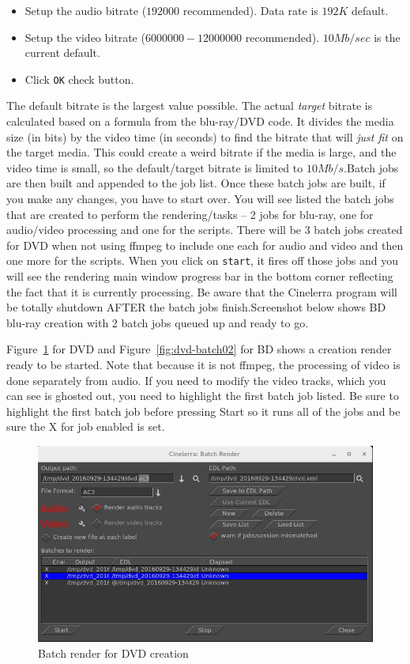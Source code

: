 \begin{itemize}
    \item Setup the audio bitrate ($192000$ recommended).  Data rate is $192K$ default.
    \item Setup the video bitrate ($6000000 - 12000000$ recommended).  $10Mb/sec$ is the current default.
    \item Click \texttt{OK} check button.
\end{itemize}

The default bitrate is the largest value possible.  The actual \textit{target} bitrate is calculated based on a formula from the blu-ray/DVD code.  It divides the media size (in bits)  by the video time (in seconds) to find the bitrate that will \textit{just fit} on the target media.  This could create a weird bitrate if the media is large, and the video time is small, so the default/target bitrate is limited to $10Mb/s$.Batch jobs are then built and appended to the job list.  Once these batch jobs are built, if you make any changes, you have to start over.  You will see listed the batch jobs that are created to perform the rendering/tasks -- 2 jobs for blu-ray, one for audio/video processing and one for the scripts.  There will be 3 batch jobs created for DVD when not using ffmpeg to include one each for audio and video and then one more for the scripts.  When you click on \texttt{start}, it fires off those jobs and you will see the rendering main window progress bar in the bottom corner reflecting the fact that it is currently processing.  Be aware that the Cinelerra program will be totally shutdown AFTER the batch jobs finish.Screenshot below shows BD blu-ray creation with 2 batch jobs queued up and ready to go.

Figure~\ref{fig:dvd-batch01} for DVD and Figure~\ref{fig:dvd-batch02} for BD shows a creation render ready to be started.  Note that because it is not ffmpeg, the processing of video is done separately from audio.  If you need to modify the video tracks, which you can see is ghosted out, you need to highlight the first batch job listed.  Be sure to highlight the first batch job before pressing Start so it runs all of the jobs and be sure the X for job enabled is set.

\begin{figure}[htpb]
    \centering
    \includegraphics[width=0.8\linewidth]{images/dvd-batch01.png}
    \caption{Batch render for DVD creation}
    \label{fig:dvd-batch01}
\end{figure}

